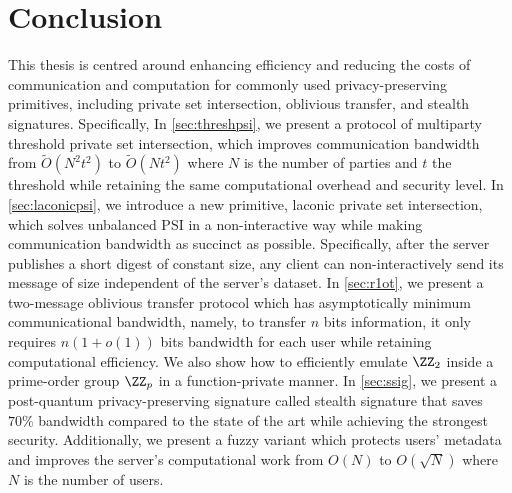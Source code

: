 \chapter{Conclusion}
\label{conclusion}
This thesis is centred around enhancing efficiency and reducing the costs of communication and computation for commonly used privacy-preserving primitives, including private set intersection, oblivious transfer, and stealth signatures. Specifically,
In \cref{sec:threshpsi}, we present a protocol of multiparty threshold private set intersection, which improves communication bandwidth from $\tilde{O}(N^2t^2)$ to $\tilde{O}(Nt^2)$ where $N$ is the number of parties and $t$ the threshold while retaining the same computational overhead and security level.
In \cref{sec:laconicpsi}, we introduce a new primitive, laconic private set intersection, which solves unbalanced PSI in a non-interactive way while making communication bandwidth as succinct as possible. Specifically, after the server publishes a short digest of constant size, any client can non-interactively send its message of size independent of the server's dataset.
In \cref{sec:r1ot}, we present a two-message oblivious transfer protocol which has asymptotically minimum communicational bandwidth, namely, to transfer $n$ bits information, it only requires $n(1+o(1))$ bits bandwidth for each user while retaining computational efficiency. We also show how to efficiently emulate $\ZZ_2$ inside a prime-order group $\ZZ_p$ in a function-private manner.
In \cref{sec:ssig}, we present a post-quantum privacy-preserving signature called stealth signature that saves ~$70\%$ bandwidth compared to the state of the art while  achieving the strongest security. Additionally, we present a fuzzy variant which protects users' metadata and improves the server's computational work from $O(N)$ to $O(\sqrt{N})$ where $N$ is the number of users.